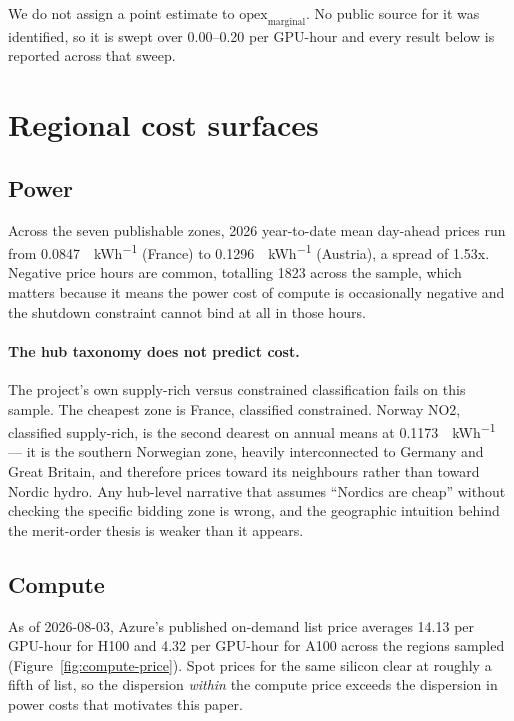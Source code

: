 \documentclass[11pt]{article}
\begin{document}
We do not assign a point estimate to $\text{opex}_{\text{marginal}}$. No
public source for it was identified, so it is swept over
\SIrange{0.00}{0.20}{\usd} per GPU-hour and every result below is reported
across that sweep.

\section{Regional cost surfaces}
\label{sec:regional}

\subsection{Power}

Across the seven publishable zones, 2026 year-to-date mean day-ahead
prices run from \SI{0.0847}{\usd\per\kWh} (France) to
\SI{0.1296}{\usd\per\kWh} (Austria), a spread of \num{1.53}x. Negative
price hours are common, totalling \num{1823} across the sample, which
matters because it means the power cost of compute is occasionally
negative and the shutdown constraint cannot bind at all in those hours.

\paragraph{The hub taxonomy does not predict cost.} The project's own
supply-rich versus constrained classification fails on this sample. The
cheapest zone is France, classified constrained. Norway NO2, classified
supply-rich, is the second dearest on annual means at \SI{0.1173}{\usd\per\kWh} --- it is
the southern Norwegian zone, heavily interconnected to Germany and Great
Britain, and therefore prices toward its neighbours rather than toward
Nordic hydro. Any hub-level narrative that assumes ``Nordics are cheap''
without checking the specific bidding zone is wrong, and the geographic
intuition behind the merit-order thesis is weaker than it appears.

\subsection{Compute}

As of 2026-08-03, Azure's published on-demand list price averages
\SI{14.13}{\usd} per GPU-hour for H100 and \SI{4.32}{\usd} per GPU-hour for
A100 across the regions sampled (Figure~\ref{fig:compute-price}). Spot
prices for the same silicon clear at roughly a fifth of list, so the
dispersion \emph{within} the compute price exceeds the dispersion in power
costs that motivates this paper.
\end{document}
